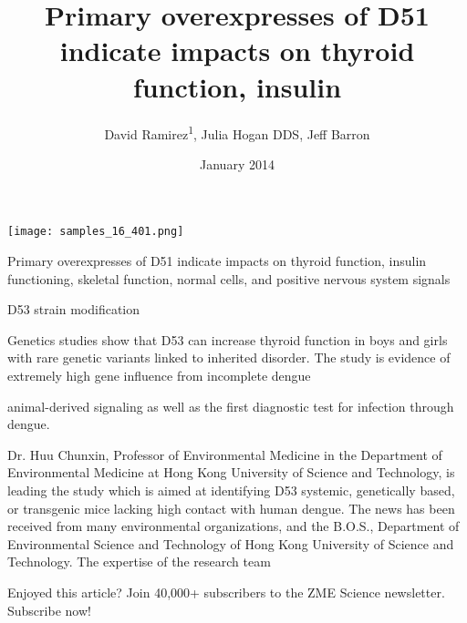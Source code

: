 \documentclass{article}
\title{Primary overexpresses of D51 indicate impacts on thyroid function, insulin}
\author{David Ramirez\textsuperscript{1},  Julia Hogan DDS,  Jeff Barron}
\affil{\textsuperscript{1}Hadassah Medical Center}
\date{January 2014}
\begin{document}
\maketitle

\begin{center}
\begin{minipage}{0.75\linewidth}
\texttt{[image: samples\_16\_401.png]}
\end{minipage}
\end{center}

Primary overexpresses of D51 indicate impacts on thyroid function, insulin functioning, skeletal function, normal cells, and positive nervous system signals

D53 strain modification

Genetics studies show that D53 can increase thyroid function in boys and girls with rare genetic variants linked to inherited disorder. The study is evidence of extremely high gene influence from incomplete dengue

animal-derived signaling as well as the first diagnostic test for infection through dengue.

Dr. Huu Chunxin, Professor of Environmental Medicine in the Department of Environmental Medicine at Hong Kong University of Science and Technology, is leading the study which is aimed at identifying D53 systemic, genetically based, or transgenic mice lacking high contact with human dengue. The news has been received from many environmental organizations, and the B.O.S., Department of Environmental Science and Technology of Hong Kong University of Science and Technology. The expertise of the research team

Enjoyed this article? Join 40,000+ subscribers to the ZME Science newsletter. Subscribe now!
\end{document}
